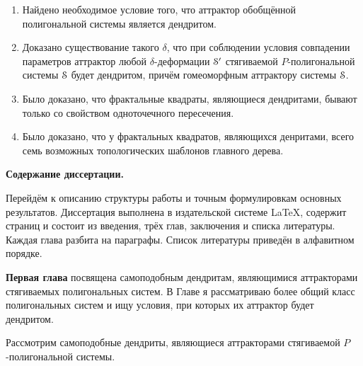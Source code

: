 \begin{enumerate}
\item Найдено необходимое условие того, что аттрактор обобщённой полигональной системы является дендритом.

\item Доказано существование такого $\delta$, что при соблюдении условия совпадении параметров аттрактор любой $\delta$-деформации ${\EuScript S}'$ стягиваемой $P$-полигональной системы ${\EuScript S}$ будет дендритом, причём гомеоморфным аттрактору системы ${\EuScript S}$.


\item Было доказано, что фрактальные квадраты, являющиеся дендритами, бывают только со свойством одноточечного пересечения.

\item Было доказано, что у фрактальных квадратов, являющихся денритами, всего семь возможных топологических шаблонов главного дерева.
\end{enumerate}

\begin{center}
    \textbf{Содержание диссертации.}
\end{center}

Перейдём к описанию структуры работы и точным формулировкам основных результатов.
Диссертация выполнена в издательской системе \LaTeX, содержит  страниц и состоит из введения, трёх глав, заключения и списка литературы.
Каждая глава разбита на параграфы.
Список литературы приведён в алфавитном порядке.

\textbf{Первая глава} посвящена самоподобным дендритам, являющимися аттракторами стягиваемых полигональных систем.
В Главе я рассматриваю более общий класс полигональных систем и ищу условия, при которых их аттрактор будет дендритом. 

Рассмотрим самоподобные дендриты, являющиеся аттракторами стягиваемой $P$-полигональной системы.

